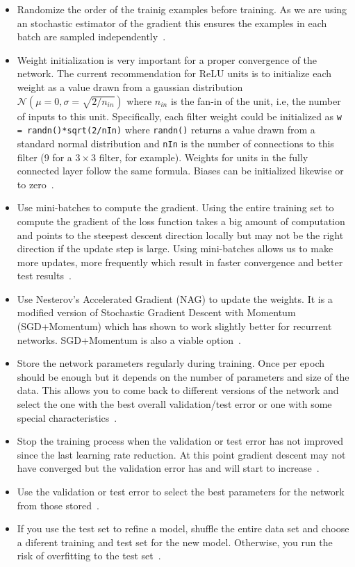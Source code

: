 \begin{itemize}
	\item Randomize the order of the trainig examples before training. As we are using an stochastic estimator of the gradient this ensures the examples in each batch are sampled independently~\cite{Bengio2012}.

	\item Weight initialization is very important for a proper convergence of the network. The current recommendation for ReLU units is to initialize each weight as a value drawn from a gaussian distribution $\mathcal{N}(\mu = 0, \sigma = \sqrt{2/n_{in}})$ where $n_{in}$ is the fan-in of the unit, i.e, the number of inputs to this unit. Specifically, each filter weight could be initialized as \texttt{w = randn()*sqrt(2/nIn)} where \texttt{randn()} returns a value drawn from a standard normal distribution and \texttt{nIn} is the number of connections to this filter (9 for a $3\times 3$ filter, for example). Weights for units in the fully connected layer follow the same formula. Biases can be initialized likewise or to zero~\cite{He2015}.

	\item Use mini-batches to compute the gradient. Using the entire training set to compute the gradient of the loss function takes a big amount of computation and points to the steepest descent direction locally but may not be the right direction if the update step is large. Using mini-batches allows us to make more updates, more frequently which result in faster convergence and better test results~\cite{Bengio2012}.

	\item Use Nesterov's Accelerated Gradient (NAG) to update the weights. It is a modified version of Stochastic Gradient Descent with Momentum (SGD+Momentum) which has shown to work slightly better for recurrent networks. SGD+Momentum is also a viable option~\cite{Karpathy2015}.

	\item Store the network parameters regularly during training. Once per epoch should be enough but it depends on the number of parameters and size of the data. This allows you to come back to different versions of the network and select the one with the best overall validation/test error or one with some special characteristics~\cite{Bengio2014}.

	\item Stop the training process when the validation or test error has not improved since the last learning rate reduction. At this point gradient descent may not have converged but the validation error has and will start to increase~\cite{Bengio2012}.

	\item Use the validation or test error to select the best parameters for the network from those stored~\cite{Bengio2014}. 

	\item If you use the test set to refine a model, shuffle the entire data set and choose a diferent training and test set for the new model. Otherwise, you run the risk of overfitting to the test set~\cite{Ng2014}.
\end{itemize}
